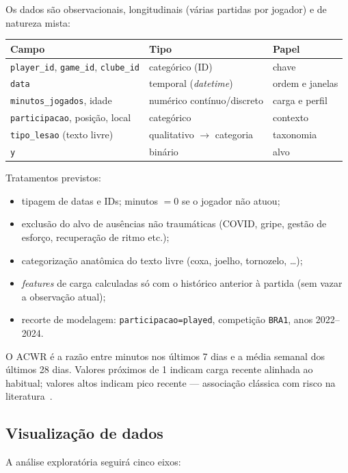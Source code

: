 \documentclass[11pt,a4paper]{article}
\begin{document}
Os dados são observacionais, longitudinais (várias partidas por jogador) e de natureza mista:

\begin{center}
\begin{tabular}{lll}
\toprule
\textbf{Campo} & \textbf{Tipo} & \textbf{Papel} \\
\midrule
\texttt{player\_id}, \texttt{game\_id}, \texttt{clube\_id} & categórico (ID) & chave \\
\texttt{data} & temporal (\textit{datetime}) & ordem e janelas \\
\texttt{minutos\_jogados}, idade & numérico contínuo/discreto & carga e perfil \\
\texttt{participacao}, posição, local & categórico & contexto \\
\texttt{tipo\_lesao} (texto livre) & qualitativo $\rightarrow$ categoria & taxonomia \\
\texttt{y} & binário & alvo \\
\bottomrule
\end{tabular}
\end{center}

Tratamentos previstos:
\begin{itemize}
  \item tipagem de datas e IDs; minutos $=0$ se o jogador não atuou;
  \item exclusão do alvo de ausências não traumáticas (COVID, gripe, gestão de esforço, recuperação de ritmo etc.);
  \item categorização anatômica do texto livre (coxa, joelho, tornozelo, \ldots);
  \item \textit{features} de carga calculadas só com o histórico anterior à partida (sem vazar a observação atual);
  \item recorte de modelagem: \texttt{participacao=played}, competição \texttt{BRA1}, anos 2022--2024.
\end{itemize}

O ACWR é a razão entre minutos nos últimos 7 dias e a média semanal dos últimos 28 dias. Valores próximos de 1 indicam carga recente alinhada ao habitual; valores altos indicam pico recente --- associação clássica com risco na literatura~\cite{rossi2022,iran2025}.

\subsection{Visualização de dados}

A análise exploratória seguirá cinco eixos:
\end{document}
